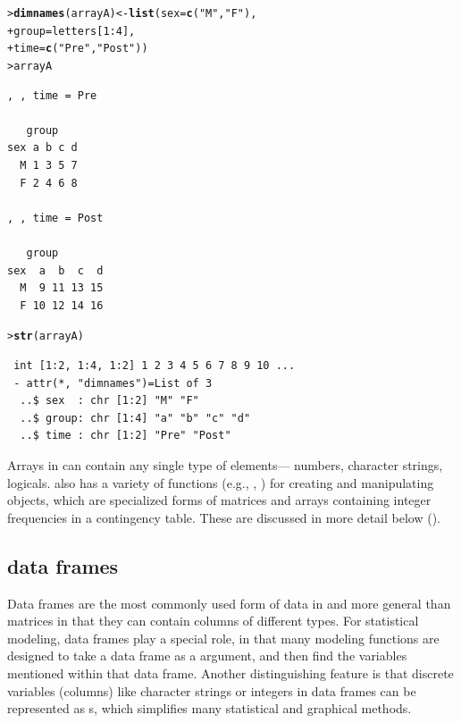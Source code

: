 \documentclass[10pt,krantz2]{krantz}\usepackage[]{graphicx}\usepackage[]{color}
\makeatletter
\newcommand{\hlnum}[1]{\textcolor[rgb]{0.686,0.059,0.569}{#1}}%
\newcommand{\hlstr}[1]{\textcolor[rgb]{0.192,0.494,0.8}{#1}}%
\newcommand{\hlopt}[1]{\textcolor[rgb]{0,0,0}{#1}}%
\newcommand{\hlstd}[1]{\textcolor[rgb]{0.345,0.345,0.345}{#1}}%
\newcommand{\hlkwb}[1]{\textcolor[rgb]{0.69,0.353,0.396}{#1}}%
\newcommand{\hlkwc}[1]{\textcolor[rgb]{0.333,0.667,0.333}{#1}}%
\newcommand{\hlkwd}[1]{\textcolor[rgb]{0.737,0.353,0.396}{\textbf{#1}}}%
\newenvironment{kframe}{%
 \def\at@end@of@kframe{}%
 \ifinner\ifhmode%
  \def\at@end@of@kframe{\end{minipage}}%
  \begin{minipage}{\columnwidth}%
 \fi\fi%
 \def\FrameCommand##1{\hskip\@totalleftmargin \hskip-\fboxsep
 \colorbox{shadecolor}{##1}\hskip-\fboxsep
     \hskip-\linewidth \hskip-\@totalleftmargin \hskip\columnwidth}%
 \MakeFramed {\advance\hsize-\width
   \@totalleftmargin\z@ \linewidth\hsize
   \@setminipage}}%
 {\par\unskip\endMakeFramed%
 \at@end@of@kframe}
\newenvironment{knitrout}{}{} %
\renewenvironment{knitrout}{\small\renewcommand{\baselinestretch}{.85}}{} %
\makeatother
\begin{document}
\begin{knitrout}
\color{fgcolor}\begin{kframe}
\begin{alltt}
\hlstd{> }\hlkwd{dimnames}\hlstd{(arrayA)} \hlkwb{<-} \hlkwd{list}\hlstd{(}\hlkwc{sex} \hlstd{=} \hlkwd{c}\hlstd{(}\hlstr{"M"}\hlstd{,} \hlstr{"F"}\hlstd{),}
\hlstd{+ }                         \hlkwc{group} \hlstd{= letters[}\hlnum{1}\hlopt{:}\hlnum{4}\hlstd{],}
\hlstd{+ }                         \hlkwc{time} \hlstd{=} \hlkwd{c}\hlstd{(}\hlstr{"Pre"}\hlstd{,} \hlstr{"Post"}\hlstd{))}
\hlstd{> }\hlstd{arrayA}
\end{alltt}
\begin{verbatim}
, , time = Pre

   group
sex a b c d
  M 1 3 5 7
  F 2 4 6 8

, , time = Post

   group
sex  a  b  c  d
  M  9 11 13 15
  F 10 12 14 16
\end{verbatim}
\begin{alltt}
\hlstd{> }\hlkwd{str}\hlstd{(arrayA)}
\end{alltt}
\begin{verbatim}
 int [1:2, 1:4, 1:2] 1 2 3 4 5 6 7 8 9 10 ...
 - attr(*, "dimnames")=List of 3
  ..$ sex  : chr [1:2] "M" "F"
  ..$ group: chr [1:4] "a" "b" "c" "d"
  ..$ time : chr [1:2] "Pre" "Post"
\end{verbatim}
\end{kframe}
\end{knitrout}

Arrays in \R can contain any single type of elements--- numbers,
character strings, logicals.  \R also has a variety of functions
(e.g., , )
for creating and manipulating  objects, which are
specialized forms of matrices and arrays containing integer
frequencies in a contingency table. These are discussed in more
detail below ().


\subsection{data frames}\label{sec:data-frames}
Data frames are the most commonly used form of data in \R and more
general than matrices in that they can contain columns of different types.
For statistical modeling, data frames play a special role, in that
many modeling functions are designed to take a data frame as a
 argument, and then find the variables mentioned within
that data frame. Another distinguishing feature is that discrete variables
(columns) like character strings  or integers 
in data frames can be represented as s, which simplifies
many statistical and graphical methods.
\end{document}
